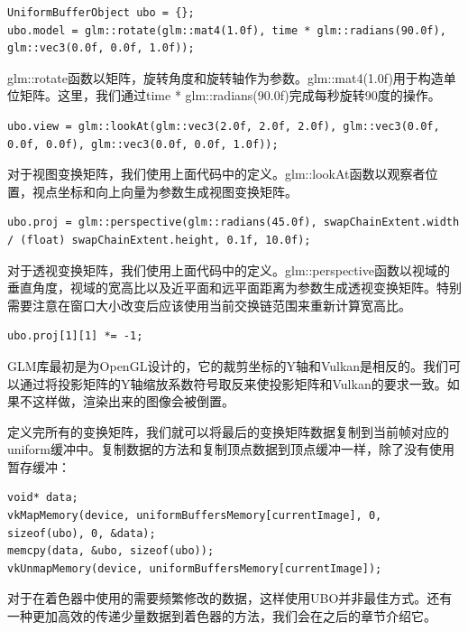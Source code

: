\documentclass{ctexart}
\begin{document}
\begin{lstlisting}[language={[ANSI]C}]
UniformBufferObject ubo = {};
ubo.model = glm::rotate(glm::mat4(1.0f), time * glm::radians(90.0f), glm::vec3(0.0f, 0.0f, 1.0f));
\end{lstlisting}

glm::rotate函数以矩阵，旋转角度和旋转轴作为参数。glm::mat4(1.0f)用于构造单位矩阵。这里，我们通过time * glm::radians(90.0f)完成每秒旋转90度的操作。

\begin{lstlisting}[language={[ANSI]C}]
ubo.view = glm::lookAt(glm::vec3(2.0f, 2.0f, 2.0f), glm::vec3(0.0f, 0.0f, 0.0f), glm::vec3(0.0f, 0.0f, 1.0f));
\end{lstlisting}

对于视图变换矩阵，我们使用上面代码中的定义。glm::lookAt函数以观察者位置，视点坐标和向上向量为参数生成视图变换矩阵。

\begin{lstlisting}[language={[ANSI]C}]
ubo.proj = glm::perspective(glm::radians(45.0f), swapChainExtent.width / (float) swapChainExtent.height, 0.1f, 10.0f);
\end{lstlisting}

对于透视变换矩阵，我们使用上面代码中的定义。glm::perspective函数以视域的垂直角度，视域的宽高比以及近平面和远平面距离为参数生成透视变换矩阵。特别需要注意在窗口大小改变后应该使用当前交换链范围来重新计算宽高比。

\begin{lstlisting}[language={[ANSI]C}]
ubo.proj[1][1] *= -1;
\end{lstlisting}

GLM库最初是为OpenGL设计的，它的裁剪坐标的Y轴和Vulkan是相反的。我们可以通过将投影矩阵的Y轴缩放系数符号取反来使投影矩阵和Vulkan的要求一致。如果不这样做，渲染出来的图像会被倒置。

定义完所有的变换矩阵，我们就可以将最后的变换矩阵数据复制到当前帧对应的uniform缓冲中。复制数据的方法和复制顶点数据到顶点缓冲一样，除了没有使用暂存缓冲：

\begin{lstlisting}[language={[ANSI]C}]
void* data;
vkMapMemory(device, uniformBuffersMemory[currentImage], 0, sizeof(ubo), 0, &data);
memcpy(data, &ubo, sizeof(ubo));
vkUnmapMemory(device, uniformBuffersMemory[currentImage]);
\end{lstlisting}

对于在着色器中使用的需要频繁修改的数据，这样使用UBO并非最佳方式。还有一种更加高效的传递少量数据到着色器的方法，我们会在之后的章节介绍它。
\end{document}
